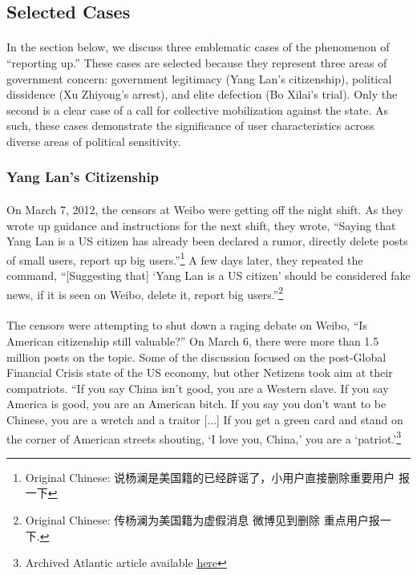 \documentclass[12pt]{article}
\begin{document}
\begin{CJK*}{UTF8}{gbsn}
\subsection{Selected Cases}

\paragraph{} In the section below, we discuss three emblematic cases of the phenomenon of ``reporting up.'' These cases are selected because they represent three areas of government concern: government legitimacy (Yang Lan's citizenship), political dissidence (Xu Zhiyong's arrest), and elite defection (Bo Xilai's trial). Only the second is a clear case of a call for collective mobilization against the state. As such, these cases demonstrate the significance of user characteristics across diverse areas of political sensitivity. 

\subsubsection{Yang Lan's Citizenship}

\paragraph{}On March 7, 2012, the censors at Weibo were getting off the night shift. As they wrote up guidance and instructions for the next shift, they wrote, ``Saying that Yang Lan is a US citizen has already been declared a rumor, directly delete posts of small users, report up big users.''\footnote{Original Chinese: 说杨澜是美国籍的已经辟谣了，小用户直接删除重要用户 报一下} A few days later, they repeated the command, ``[Suggesting that] ‘Yang Lan is a US citizen' should be considered fake news, if it is seen on Weibo, delete it, report big users.''\footnote{Original Chinese: 传杨澜为美国籍为虚假消息 微博见到删除 重点用户报一下.} 
\paragraph{} The censors were attempting to shut down a raging debate on Weibo, ``Is American citizenship still valuable?'' On March 6, there were more than 1.5 million posts on the topic. Some of the discussion focused on the post-Global Financial Crisis state of the US economy, but other Netizens took aim at their compatriots. ``If you say China isn't good, you are a Western slave. If you say America is good, you are an American bitch. If you say you don't want to be Chinese, you are a wretch and a traitor [...] If you get a green card and stand on the corner of American streets shouting, `I love you, China,' you are a `patriot.'\footnote{Archived Atlantic article available \href{https://web.archive.org/web/20170827203544/}{here}}

\end{CJK*}
\end{document}
